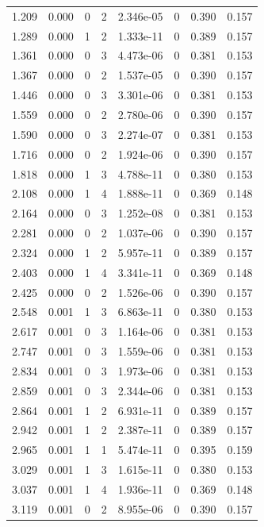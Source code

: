 \documentclass[preview]{standalone}
\begin{document}
{{\begin{tabular}{L{1.2cm}C{1.2cm} C{0.3cm}C{0.5cm} C{1.4cm}C{1.4cm} C{1.4cm}C{1.4cm}}
  1.209  &  0.000  & 0     &  2 &  2.346e-05  & 0  & 0.390 &  0.157   \\ 
  1.289  &  0.000  & 1     &  2 &  1.333e-11  & 0  & 0.389 &  0.157   \\ 
  1.361  &  0.000  & 0     &  3 &  4.473e-06  & 0  & 0.381 &  0.153   \\ 
  1.367  &  0.000  & 0     &  2 &  1.537e-05  & 0  & 0.390 &  0.157   \\ 
  1.446  &  0.000  & 0     &  3 &  3.301e-06  & 0  & 0.381 &  0.153   \\ 
  1.559  &  0.000  & 0     &  2 &  2.780e-06  & 0  & 0.390 &  0.157   \\ 
  1.590  &  0.000  & 0     &  3 &  2.274e-07  & 0  & 0.381 &  0.153   \\ 
  1.716  &  0.000  & 0     &  2 &  1.924e-06  & 0  & 0.390 &  0.157   \\ 
  1.818  &  0.000  & 1     &  3 &  4.788e-11  & 0  & 0.380 &  0.153   \\ 
  2.108  &  0.000  & 1     &  4 &  1.888e-11  & 0  & 0.369 &  0.148   \\ 
  2.164  &  0.000  & 0     &  3 &  1.252e-08  & 0  & 0.381 &  0.153   \\ 
  2.281  &  0.000  & 0     &  2 &  1.037e-06  & 0  & 0.390 &  0.157   \\ 
  2.324  &  0.000  & 1     &  2 &  5.957e-11  & 0  & 0.389 &  0.157   \\ 
  2.403  &  0.000  & 1     &  4 &  3.341e-11  & 0  & 0.369 &  0.148   \\ 
  2.425  &  0.000  & 0     &  2 &  1.526e-06  & 0  & 0.390 &  0.157   \\ 
  2.548  &  0.001  & 1     &  3 &  6.863e-11  & 0  & 0.380 &  0.153   \\ 
  2.617  &  0.001  & 0     &  3 &  1.164e-06  & 0  & 0.381 &  0.153   \\ 
  2.747  &  0.001  & 0     &  3 &  1.559e-06  & 0  & 0.381 &  0.153   \\ 
  2.834  &  0.001  & 0     &  3 &  1.973e-06  & 0  & 0.381 &  0.153   \\ 
  2.859  &  0.001  & 0     &  3 &  2.344e-06  & 0  & 0.381 &  0.153   \\ 
  2.864  &  0.001  & 1     &  2 &  6.931e-11  & 0  & 0.389 &  0.157   \\ 
  2.942  &  0.001  & 1     &  2 &  2.387e-11  & 0  & 0.389 &  0.157   \\ 
  2.965  &  0.001  & 1     &  1 &  5.474e-11  & 0  & 0.395 &  0.159   \\ 
  3.029  &  0.001  & 1     &  3 &  1.615e-11  & 0  & 0.380 &  0.153   \\ 
  3.037  &  0.001  & 1     &  4 &  1.936e-11  & 0  & 0.369 &  0.148   \\ 
  3.119  &  0.001  & 0     &  2 &  8.955e-06  & 0  & 0.390 &  0.157   \\ 
\hline 
\end{tabular} 

}}
\end{document}
